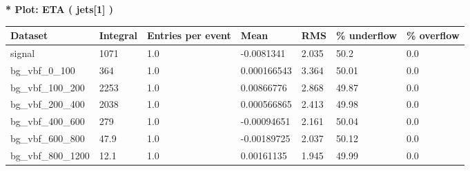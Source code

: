 \documentclass[a4paper, 10pt]{article}
\begin{document}
\textbf{* Plot: ETA ( jets[1] ) }\\
   \begin{table}[H]
  \begin{center}
    \begin{tabular}{|m{23.0mm}|m{23.0mm}|m{18.0mm}|m{19.0mm}|m{19.0mm}|m{19.0mm}|m{19.0mm}|}
      \hline
      {\cellcolor{yellow}         Dataset}& {\cellcolor{yellow}         Integral}& {\cellcolor{yellow}         Entries per event}& {\cellcolor{yellow}         Mean}& {\cellcolor{yellow}         RMS}& {\cellcolor{yellow}         \% underflow}& {\cellcolor{yellow}         \% overflow}\\
      \hline
      {\cellcolor{white}         signal}& {\cellcolor{white}         1071}& {\cellcolor{white}         1.0}& {\cellcolor{white}         -0.0081341}& {\cellcolor{white}         2.035}& {\cellcolor{red}         50.2}& {\cellcolor{red}         0.0}\\
      \hline
      {\cellcolor{white}         bg\_vbf\_0\_100}& {\cellcolor{white}         364}& {\cellcolor{white}         1.0}& {\cellcolor{white}         0.000166543}& {\cellcolor{white}         3.364}& {\cellcolor{red}         50.01}& {\cellcolor{red}         0.0}\\
      \hline
      {\cellcolor{white}         bg\_vbf\_100\_200}& {\cellcolor{white}         2253}& {\cellcolor{white}         1.0}& {\cellcolor{white}         0.00866776}& {\cellcolor{white}         2.868}& {\cellcolor{red}         49.87}& {\cellcolor{red}         0.0}\\
      \hline
      {\cellcolor{white}         bg\_vbf\_200\_400}& {\cellcolor{white}         2038}& {\cellcolor{white}         1.0}& {\cellcolor{white}         0.000566865}& {\cellcolor{white}         2.413}& {\cellcolor{red}         49.98}& {\cellcolor{red}         0.0}\\
      \hline
      {\cellcolor{white}         bg\_vbf\_400\_600}& {\cellcolor{white}         279}& {\cellcolor{white}         1.0}& {\cellcolor{white}         -0.00094651}& {\cellcolor{white}         2.161}& {\cellcolor{red}         50.04}& {\cellcolor{red}         0.0}\\
      \hline
      {\cellcolor{white}         bg\_vbf\_600\_800}& {\cellcolor{white}         47.9}& {\cellcolor{white}         1.0}& {\cellcolor{white}         -0.00189725}& {\cellcolor{white}         2.037}& {\cellcolor{red}         50.12}& {\cellcolor{red}         0.0}\\
      \hline
      {\cellcolor{white}         bg\_vbf\_800\_1200}& {\cellcolor{white}         12.1}& {\cellcolor{white}         1.0}& {\cellcolor{white}         0.00161135}& {\cellcolor{white}         1.945}& {\cellcolor{red}         49.99}& {\cellcolor{red}         0.0}\\

\end{tabular}
\end{center}
\end{table}
\end{document}
